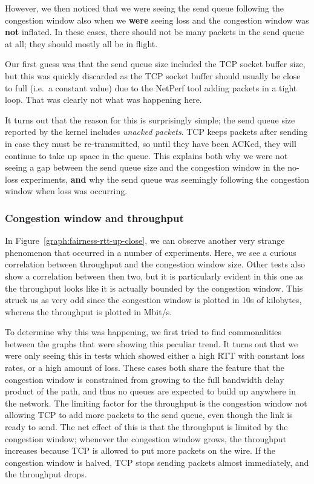 However, we then noticed that we were seeing the send queue following the
congestion window also when we \textbf{were} seeing loss and the congestion
window was \textbf{not} inflated. In these cases, there should not be many
packets in the send queue at all; they should mostly all be in flight.

Our first guess was that the send queue size included the TCP socket buffer
size, but this was quickly discarded as the TCP socket buffer should usually be
close to full (i.e.\ a constant value) due to the NetPerf tool adding packets in
a tight loop. That was clearly not what was happening here.

It turns out that the reason for this is surprisingly simple; the send queue
size reported by the kernel includes \textit{unacked packets}. TCP keeps packets
after sending in case they must be re-transmitted, so until they have been
ACKed, they will continue to take up space in the queue. This explains both why
we were not seeing a gap between the send queue size and the congestion window
in the no-loss experiments, \textbf{and} why the send queue was seemingly
following the congestion window when loss was occurring.

\subsubsection{Congestion window and throughput}

In Figure~\ref{graph:fairness-rtt-up-close}, we can observe another very strange
phenomenon that occurred in a number of experiments. Here, we see a curious
correlation between throughput and the congestion window size. Other tests also
show a correlation between then two, but it is particularly evident in this one
as the throughput looks like it is actually bounded by the congestion window.
This struck us as very odd since the congestion window is plotted in 10s of
kilobytes, whereas the throughput is plotted in Mbit/s.

To determine why this was happening, we first tried to find commonalities
between the graphs that were showing this peculiar trend. It turns out that we
were only seeing this in tests which showed either a high RTT with constant loss
rates, or a high amount of loss. These cases both share the feature that the
congestion window is constrained from growing to the full bandwidth delay
product of the path, and thus no queues are expected to build up anywhere in the
network. The limiting factor for the throughput is the congestion window not
allowing TCP to add more packets to the send queue, even though the link is
ready to send. The net effect of this is that the throughput is limited by the
congestion window; whenever the congestion window grows, the throughput
increases because TCP is allowed to put more packets on the wire. If the
congestion window is halved, TCP stops sending packets almost immediately, and
the throughput drops.

